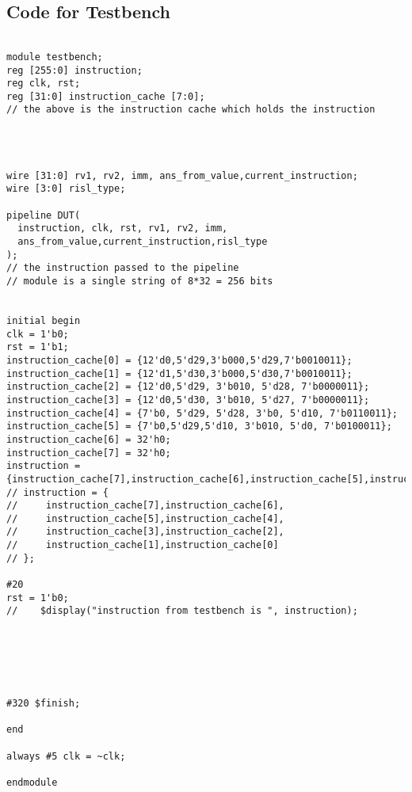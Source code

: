 \subsection{Code for Testbench}
\lstset{language=Verilog}
\begin{lstlisting}
  
module testbench;
reg [255:0] instruction;
reg clk, rst;
reg [31:0] instruction_cache [7:0];
// the above is the instruction cache which holds the instruction




wire [31:0] rv1, rv2, imm, ans_from_value,current_instruction;
wire [3:0] risl_type;

pipeline DUT(
  instruction, clk, rst, rv1, rv2, imm, 
  ans_from_value,current_instruction,risl_type
);
// the instruction passed to the pipeline 
// module is a single string of 8*32 = 256 bits


initial begin
clk = 1'b0;
rst = 1'b1;
instruction_cache[0] = {12'd0,5'd29,3'b000,5'd29,7'b0010011};
instruction_cache[1] = {12'd1,5'd30,3'b000,5'd30,7'b0010011};
instruction_cache[2] = {12'd0,5'd29, 3'b010, 5'd28, 7'b0000011};
instruction_cache[3] = {12'd0,5'd30, 3'b010, 5'd27, 7'b0000011};
instruction_cache[4] = {7'b0, 5'd29, 5'd28, 3'b0, 5'd10, 7'b0110011};
instruction_cache[5] = {7'b0,5'd29,5'd10, 3'b010, 5'd0, 7'b0100011};
instruction_cache[6] = 32'h0;
instruction_cache[7] = 32'h0;
instruction = {instruction_cache[7],instruction_cache[6],instruction_cache[5],instruction_cache[4],instruction_cache[3],instruction_cache[2],instruction_cache[1],instruction_cache[0]};
// instruction = {
//     instruction_cache[7],instruction_cache[6],
//     instruction_cache[5],instruction_cache[4],
//     instruction_cache[3],instruction_cache[2],
//     instruction_cache[1],instruction_cache[0]
// };

#20
rst = 1'b0;
//    $display("instruction from testbench is ", instruction);






#320 $finish;

end

always #5 clk = ~clk;

endmodule


\end{lstlisting}